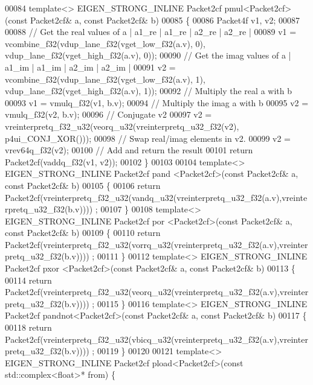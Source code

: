 \begin{DoxyCode}
00084 \textcolor{keyword}{template}<> EIGEN\_STRONG\_INLINE Packet2cf pmul<Packet2cf>(\textcolor{keyword}{const} Packet2cf& a, \textcolor{keyword}{const} Packet2cf& b)
00085 \{
00086   Packet4f v1, v2;
00087 
00088   \textcolor{comment}{// Get the real values of a | a1\_re | a1\_re | a2\_re | a2\_re |}
00089   v1 = vcombine\_f32(vdup\_lane\_f32(vget\_low\_f32(a.v), 0), vdup\_lane\_f32(vget\_high\_f32(a.v), 0));
00090   \textcolor{comment}{// Get the imag values of a | a1\_im | a1\_im | a2\_im | a2\_im |}
00091   v2 = vcombine\_f32(vdup\_lane\_f32(vget\_low\_f32(a.v), 1), vdup\_lane\_f32(vget\_high\_f32(a.v), 1));
00092   \textcolor{comment}{// Multiply the real a with b}
00093   v1 = vmulq\_f32(v1, b.v);
00094   \textcolor{comment}{// Multiply the imag a with b}
00095   v2 = vmulq\_f32(v2, b.v);
00096   \textcolor{comment}{// Conjugate v2 }
00097   v2 = vreinterpretq\_f32\_u32(veorq\_u32(vreinterpretq\_u32\_f32(v2), p4ui\_CONJ\_XOR()));
00098   \textcolor{comment}{// Swap real/imag elements in v2.}
00099   v2 = vrev64q\_f32(v2);
00100   \textcolor{comment}{// Add and return the result}
00101   \textcolor{keywordflow}{return} Packet2cf(vaddq\_f32(v1, v2));
00102 \}
00103 
00104 \textcolor{keyword}{template}<> EIGEN\_STRONG\_INLINE Packet2cf pand   <Packet2cf>(\textcolor{keyword}{const} Packet2cf& a, \textcolor{keyword}{const} Packet2cf& b)
00105 \{
00106   \textcolor{keywordflow}{return} Packet2cf(vreinterpretq\_f32\_u32(vandq\_u32(vreinterpretq\_u32\_f32(a.v),vreinterpretq\_u32\_f32(b.v))))
      ;
00107 \}
00108 \textcolor{keyword}{template}<> EIGEN\_STRONG\_INLINE Packet2cf por    <Packet2cf>(\textcolor{keyword}{const} Packet2cf& a, \textcolor{keyword}{const} Packet2cf& b)
00109 \{
00110   \textcolor{keywordflow}{return} Packet2cf(vreinterpretq\_f32\_u32(vorrq\_u32(vreinterpretq\_u32\_f32(a.v),vreinterpretq\_u32\_f32(b.v))))
      ;
00111 \}
00112 \textcolor{keyword}{template}<> EIGEN\_STRONG\_INLINE Packet2cf pxor   <Packet2cf>(\textcolor{keyword}{const} Packet2cf& a, \textcolor{keyword}{const} Packet2cf& b)
00113 \{
00114   \textcolor{keywordflow}{return} Packet2cf(vreinterpretq\_f32\_u32(veorq\_u32(vreinterpretq\_u32\_f32(a.v),vreinterpretq\_u32\_f32(b.v))))
      ;
00115 \}
00116 \textcolor{keyword}{template}<> EIGEN\_STRONG\_INLINE Packet2cf pandnot<Packet2cf>(\textcolor{keyword}{const} Packet2cf& a, \textcolor{keyword}{const} Packet2cf& b)
00117 \{
00118   \textcolor{keywordflow}{return} Packet2cf(vreinterpretq\_f32\_u32(vbicq\_u32(vreinterpretq\_u32\_f32(a.v),vreinterpretq\_u32\_f32(b.v))))
      ;
00119 \}
00120 
00121 \textcolor{keyword}{template}<> EIGEN\_STRONG\_INLINE Packet2cf pload<Packet2cf>(\textcolor{keyword}{const} std::complex<float>* from) \{ 

\end{DoxyCode}
